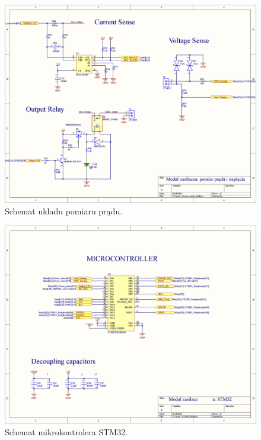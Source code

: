 \begin{figure}
    \begin{center}
        \includegraphics[width = 21cm]{zalaczniki/zasilacz/Zasilacz_regulowany_Strona_05.jpg}
        \caption{Schemat ukladu pomiaru prądu.}
    \end{center}
\end{figure}

\begin{figure}
    \begin{center}
        \includegraphics[width = 21cm]{zalaczniki/zasilacz/Zasilacz_regulowany_Strona_06.jpg}
        \caption{Schemat mikrokontrolera STM32.}
    \end{center}
\end{figure}

